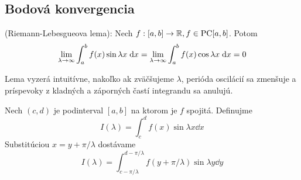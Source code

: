 
\subsection{Bodová konvergencia}
\begin{lema}
    (Riemann-Lebesgueova lema):
    Nech $f: [a,b]\rightarrow {\mathbb R}, f\in \mbox{PC}[a,b]$. Potom
    \begin{equation}
        \lim_{\lambda\rightarrow\infty} \int_a^b f(x) \sin \lambda x \; \mathrm{d} x=
        \lim_{\lambda\rightarrow\infty} \int_a^b f(x) \cos \lambda x \; \mathrm{d} x=
        0
    \end{equation}
\end{lema}

\begin{dokaz}
    Lema vyzerá intuitívne, nakoľko ak zväčšujeme $\lambda$,
    perióda oscilácií sa zmenšuje a príspevoky
    z kladných a záporných častí integrandu sa anulujú.

    \def\pil{\pi/\lambda}

    Nech $(c,d)$ je podinterval $[a,b]$ na ktorom je $f$ spojitá.
    Definujme 
    \begin{equation}
        I(\lambda) = \int_c^d f(x) \sin \lambda x \dd x
        \label{eq:riem_leb_I1}
    \end{equation}
    Substitúciou $x=y+\pil$ dostávame
    \begin{equation}
        I(\lambda) = \int_{c-\pil}^{d-\pil}
            f \left(y+\pil\right) \sin \lambda y \dd y
        \label{eq:riem_leb_I2}
    \end{equation}


\end{dokaz}
